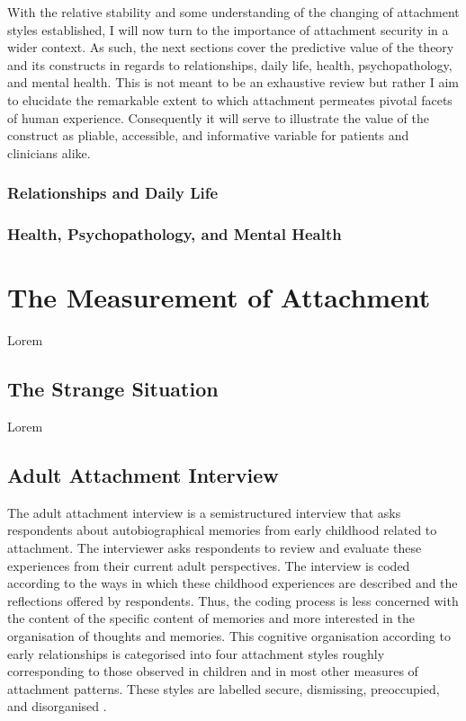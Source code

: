 \documentclass[12pt]{report}
\begin{document}
With the relative stability and some understanding of the changing of attachment styles established, I will now turn to the importance of attachment security in a wider context. As such, the next sections cover the predictive value of the theory and its constructs in regards to relationships, daily life, health, psychopathology, and mental health. This is not meant to be an exhaustive review but rather I aim to elucidate the remarkable extent to which attachment permeates pivotal facets of human experience. Consequently it will serve to illustrate the value of the construct as pliable, accessible, and informative variable for patients and clinicians alike.

\subsubsection{Relationships and Daily Life}

\subsubsection{Health, Psychopathology, and Mental Health}

\section{The Measurement of Attachment}
Lorem

\subsection{The Strange Situation}
Lorem

\subsection{Adult Attachment Interview}
The adult attachment interview is a semistructured interview that asks respondents about autobiographical memories from early childhood related to attachment. The interviewer asks respondents to review and evaluate these experiences from their current adult perspectives. The interview is coded according to the ways in which these childhood experiences are described and the reflections offered by respondents. Thus, the coding process is less concerned with the content of the specific content of memories and more interested in the organisation of thoughts and memories. This cognitive organisation according to early relationships is categorised into four attachment styles roughly corresponding to those observed in children and in most other measures of attachment patterns. These styles are labelled secure, dismissing, preoccupied, and disorganised \cite{Hesse1999, AAITest}.
\end{document}
